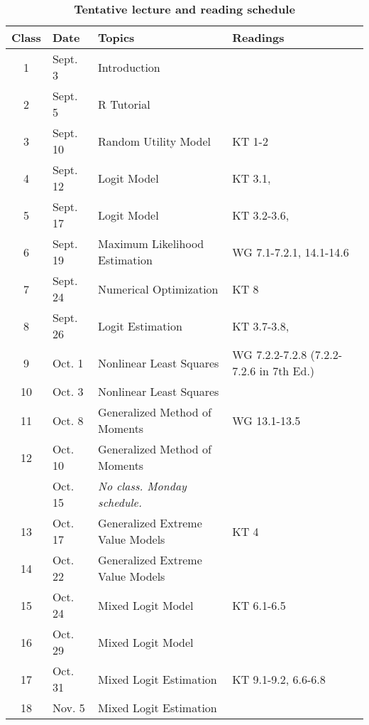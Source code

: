 \documentclass[11pt,letterpaper]{article}
\begin{document}
\begin{NoHyper}
\begin{table}[!ht]
	\centering
	\begin{threeparttable}
		\caption*{\textbf{Tentative lecture and reading schedule}}
   		\begin{tabular}{@{\extracolsep{0.35cm}} c l l l @{}}
    		\toprule
		    \textbf{Class} & \textbf{Date} & \textbf{Topics} & \textbf{Readings}\tnote{1} \\ \toprule
    		1 & Sept. 3 & Introduction & \\
    		2 & Sept. 5 & R Tutorial & \textcite{reiss_structural_2007}\\
    		3 & Sept. 10 & Random Utility Model & KT 1-2\\
    		4 & Sept. 12 & Logit Model & KT 3.1, \textcite{gruber_tax_1994} \\
    		5 & Sept. 17 & Logit Model & KT 3.2-3.6, \textcite{adamowicz_combining_1994} \\
    		6 & Sept. 19 & Maximum Likelihood Estimation & WG 7.1-7.2.1, 14.1-14.6 \\
    		7 & Sept. 24 & Numerical Optimization & KT 8 \\
    		8 & Sept. 26 & Logit Estimation & KT 3.7-3.8, \textcite{bayer_migration_2009} \\
    		9 & Oct. 1 & Nonlinear Least Squares & WG 7.2.2-7.2.8 (7.2.2-7.2.6 in 7th Ed.) \\
    		10 & Oct. 3 & Nonlinear Least Squares & \textcite{schaefer_dependence_1998} \\
    		11 & Oct. 8 & Generalized Method of Moments & WG 13.1-13.5 \\
    		12 & Oct. 10 & Generalized Method of Moments & \textcite{crawford_welfare_2012} \\
    		& Oct. 15 & \emph{No class. Monday schedule.} & \\
    		13 & Oct. 17 & Generalized Extreme Value Models & KT 4 \\
    		14 & Oct. 22 & Generalized Extreme Value Models & \textcite{train_demand_1987} \\
    		15 & Oct. 24 & Mixed Logit Model & KT 6.1-6.5 \\
    		16 & Oct. 29 & Mixed Logit Model & \textcite{revelt_mixed_1998} \\
    		17 & Oct. 31 & Mixed Logit Estimation & KT 9.1-9.2, 6.6-6.8 \\
    		18 & Nov. 5 & Mixed Logit Estimation & \textcite{handel_adverse_2013} \\

\end{tabular}
\end{threeparttable}
\end{table}
\end{NoHyper}
\end{document}
